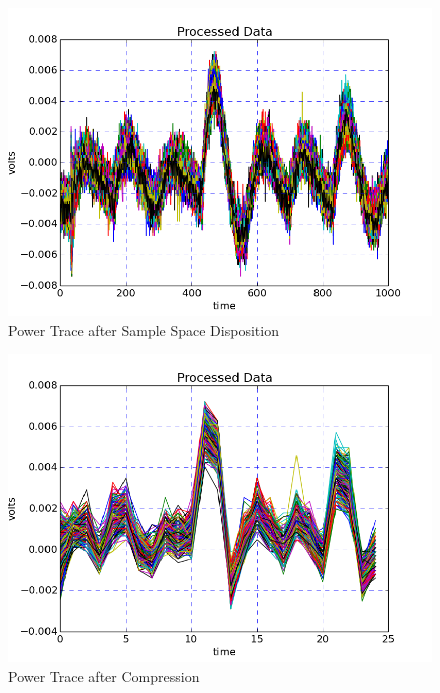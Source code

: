 \documentclass{llncs}
\numberwithin{algorithm}{chapter}
\begin{document}
\begin{figure}[H]
\begin{center}
\includegraphics[scale=0.8]{figures/scaTrace3}
\caption{\label{fig:ptsp}Power Trace after Sample Space Disposition}
\end{center} 
\vspace{-3ex}
\end{figure}

\begin{figure}[H]
\begin{center}
\includegraphics[scale=0.8]{figures/scaTrace4}
\caption{\label{fig:ptcp}Power Trace after Compression}
\end{center} 
\vspace{-3ex}
\end{figure}
\end{document}
